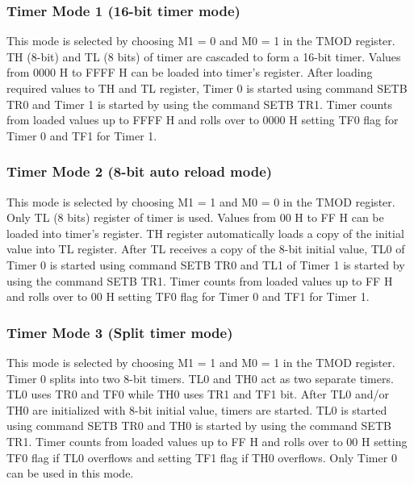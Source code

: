\documentclass{lab_sheet}
\begin{document}
\subsubsection*{Timer Mode 1 (16-bit timer mode)}
This mode is selected by choosing M1 = 0 and M0 = 1
in the TMOD register. TH (8-bit) and TL (8 bits) of timer
are cascaded to form a 16-bit timer. Values from 0000 H
to FFFF H can be loaded into timer’s register. After loading required values to TH and TL register,
Timer 0 is started using command SETB TR0 and Timer 1
is started by using the command SETB TR1. Timer counts
from loaded values up to FFFF H and rolls over to 0000 H
setting TF0 flag for Timer 0 and TF1 for Timer 1. 
\subsubsection*{Timer Mode 2 (8-bit auto reload mode)}
This mode is selected by choosing M1 = 1 and M0 = 0
in the TMOD register. Only TL (8 bits) register of timer is
used. Values from 00 H to FF H can be loaded into timer’s
register. TH register automatically loads a copy of the
initial value into TL register.
After TL receives a copy of the 8-bit initial value, TL0
of Timer 0 is started using command SETB TR0 and TL1
of Timer 1 is started by using the command SETB TR1.
Timer counts from loaded values up to FF H and rolls over
to 00 H setting TF0 flag for Timer 0 and TF1 for Timer 1.
\subsubsection*{Timer Mode 3 (Split timer mode)}
This mode is selected by choosing M1 = 1 and M0 = 1
in the TMOD register. Timer 0 splits into two 8-bit timers.
TL0 and TH0 act as two separate timers. TL0 uses TR0 and
TF0 while TH0 uses TR1 and TF1 bit. After TL0 and/or TH0 are initialized with 8-bit initial
value, timers are started. TL0 is started using command
SETB TR0 and TH0 is started by using the command
SETB TR1. Timer counts from loaded values up to FF H
and rolls over to 00 H setting TF0 flag if TL0 overflows
and setting TF1 flag if TH0 overflows. Only Timer 0 can be used in this mode.
\end{document}
